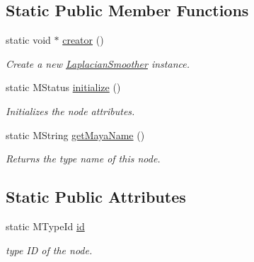 \subsection*{Static Public Member Functions}
\begin{DoxyCompactItemize}
\item 
static void $\ast$ \hyperlink{class_laplacian_smoother_a4775db7de0fe100ce7424b075cc88dcb}{creator} ()
\begin{DoxyCompactList}\small\item\em Create a new \hyperlink{class_laplacian_smoother}{Laplacian\+Smoother} instance. \end{DoxyCompactList}\item 
\hypertarget{class_laplacian_smoother_a6c5627afc523a4b436b167996db932ad}{static M\+Status \hyperlink{class_laplacian_smoother_a6c5627afc523a4b436b167996db932ad}{initialize} ()}\label{class_laplacian_smoother_a6c5627afc523a4b436b167996db932ad}

\begin{DoxyCompactList}\small\item\em Initializes the node attributes. \end{DoxyCompactList}\item 
\hypertarget{class_laplacian_smoother_a25f65e19e2b3953b850e2b246a7ff072}{static M\+String \hyperlink{class_laplacian_smoother_a25f65e19e2b3953b850e2b246a7ff072}{get\+Maya\+Name} ()}\label{class_laplacian_smoother_a25f65e19e2b3953b850e2b246a7ff072}

\begin{DoxyCompactList}\small\item\em Returns the type name of this node. \end{DoxyCompactList}\end{DoxyCompactItemize}
\subsection*{Static Public Attributes}
\begin{DoxyCompactItemize}
\item 
\hypertarget{class_laplacian_smoother_ab0803d4ade46ef489b64beb6114eb584}{static M\+Type\+Id \hyperlink{class_laplacian_smoother_ab0803d4ade46ef489b64beb6114eb584}{id}}\label{class_laplacian_smoother_ab0803d4ade46ef489b64beb6114eb584}

\begin{DoxyCompactList}\small\item\em type I\+D of the node. \end{DoxyCompactList}\end{DoxyCompactItemize}



